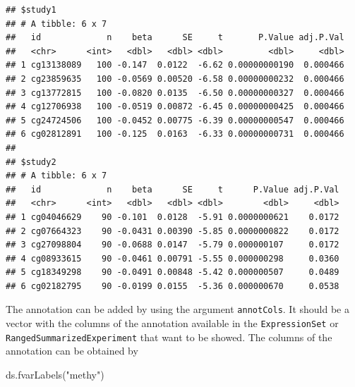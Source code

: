 \documentclass[
]{book}
\newenvironment{Shaded}{\begin{snugshade}}{\end{snugshade}}
\newcommand{\FunctionTok}[1]{\textcolor[rgb]{0.00,0.00,0.00}{#1}}
\newcommand{\NormalTok}[1]{#1}
\newcommand{\StringTok}[1]{\textcolor[rgb]{0.31,0.60,0.02}{#1}}
\begin{document}
\begin{verbatim}
## $study1
## # A tibble: 6 x 7
##   id             n    beta      SE     t       P.Value adj.P.Val
##   <chr>      <int>   <dbl>   <dbl> <dbl>         <dbl>     <dbl>
## 1 cg13138089   100 -0.147  0.0122  -6.62 0.00000000190  0.000466
## 2 cg23859635   100 -0.0569 0.00520 -6.58 0.00000000232  0.000466
## 3 cg13772815   100 -0.0820 0.0135  -6.50 0.00000000327  0.000466
## 4 cg12706938   100 -0.0519 0.00872 -6.45 0.00000000425  0.000466
## 5 cg24724506   100 -0.0452 0.00775 -6.39 0.00000000547  0.000466
## 6 cg02812891   100 -0.125  0.0163  -6.33 0.00000000731  0.000466
## 
## $study2
## # A tibble: 6 x 7
##   id             n    beta      SE     t      P.Value adj.P.Val
##   <chr>      <int>   <dbl>   <dbl> <dbl>        <dbl>     <dbl>
## 1 cg04046629    90 -0.101  0.0128  -5.91 0.0000000621    0.0172
## 2 cg07664323    90 -0.0431 0.00390 -5.85 0.0000000822    0.0172
## 3 cg27098804    90 -0.0688 0.0147  -5.79 0.000000107     0.0172
## 4 cg08933615    90 -0.0461 0.00791 -5.55 0.000000298     0.0360
## 5 cg18349298    90 -0.0491 0.00848 -5.42 0.000000507     0.0489
## 6 cg02182795    90 -0.0199 0.0155  -5.36 0.000000670     0.0538
\end{verbatim}

The annotation can be added by using the argument \texttt{annotCols}. It should be a vector with the columns of the annotation available in the \texttt{ExpressionSet} or \texttt{RangedSummarizedExperiment} that want to be showed. The columns of the annotation can be obtained by

\begin{Shaded}
\begin{Highlighting}[]
\FunctionTok{ds.fvarLabels}\NormalTok{(}\StringTok{"methy"}\NormalTok{)}
\end{Highlighting}
\end{Shaded}
\end{document}

